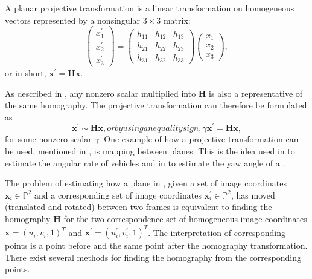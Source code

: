 \begin{definition} \label{def:projtrans}
	A planar projective transformation is a linear transformation on homogeneous  vectors represented by a nonsingular $3 \times 3$ matrix:
	\begin{equation}
		\begin{pmatrix} x^\prime_1 \\ x^\prime_2 \\ x^\prime_3 \end{pmatrix}
		=
		\begin{pmatrix}
			h_{11} & h_{12} & h_{13} \\
			h_{21} & h_{22} & h_{23} \\
			h_{31} & h_{32} & h_{33}
		\end{pmatrix}
		\begin{pmatrix} x_1 \\ x_2 \\ x_3 \end{pmatrix},
	\end{equation}
	or in short, $\bm{x}^\prime = \bm{H} \bm{x}$.
\end{definition}
%
As described in \cite{Nordberg:2015}, any nonzero scalar multiplied into $\bm{H}$ is also a representative of the same homography.
The projective transformation can therefore be formulated as
%
\begin{subequations}
\begin{equation}
	\label{eq:homography}
	\bm{x}^\prime \sim \bm{H} \bm{x},
\end{equation}
%
or by using an equality sign,
%
\begin{equation}
	\label{eq:homographyequality}
	\gamma \bm{x}^\prime = \bm{H} \bm{x},
\end{equation}
\end{subequations}
%
for some nonzero scalar $\gamma$.
One example of how a projective transformation can be used, mentioned in \cite{Hartley:2004}, is mapping between planes. 
This is the idea used in \cite{Gabb:2013} to estimate the angular rate of vehicles and in \cite{Mondragon:2010} to estimate the yaw angle of a \abbrUAV.

The problem of estimating how a plane in , given a set of image coordinates $\bm{x}_i \in \mathbb{P}^2$ and a corresponding set of image coordinates $\bm{x}^\prime_i \in \mathbb{P}^2$, has moved (translated and rotated) between two frames is equivalent to finding the homography $\bm{H}$ for the two correspondence set of homogeneous image coordinates $\bm{x} = (u_i, v_i, 1)^T$ and $\bm{x}^\prime = (u^\prime_i, v^\prime_i, 1)^T$.
The interpretation of corresponding points is a point before and the same point after the homography transformation.
There exist several methods for finding the homography from the corresponding points.

